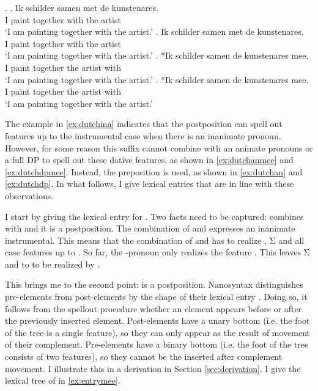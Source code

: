 \documentclass[11pt,a4paper]{article}
\begin{document}
\ex.
\ag. Ik schilder samen met de kunstenares.\\
 I paint together with the artist\\
 `I am painting together with the artist.'\label{ex:dutchan}
\bg. Ik schilder samen met de kunstenares.\\
 I paint together with the artist\\
 `I am painting together with the artist.'\label{ex:dutchdp}
\bg. *Ik schilder samen de kunstenares mee.\\
 I paint together the artist with\\
 `I am painting together with the artist.'\label{ex:dutchanmee}
\bg. *Ik schilder samen de kunstenares mee.\\
 I paint together the artist with\\
 `I am painting together with the artist.'\label{ex:dutchdpmee}

The example in \ref{ex:dutchina} indicates that the postposition  can spell out features up to the instrumental case when there is an inanimate pronoun. However, for some reason this suffix cannot combine with an animate pronouns or a full DP to spell out these dative features, as shown in \ref{ex:dutchanmee} and \ref{ex:dutchdpmee}. Instead, the preposition  is used, as shown in \ref{ex:dutchan} and \ref{ex:dutchdp}.
In what follows, I give lexical entries that are in line with these observations.

I start by giving the lexical entry for . Two facts need to be captured:  combines with  and it is a postposition. The combination of  and  expresses an inanimate instrumental.
This means that the combination of  and  has to realize , Σ and all case features up to . So far, the -pronoun  only realizes the feature . This leaves Σ and  to  to be realized by .

This brings me to the second point:  is a postposition. Nanosyntax distinguishes pre-elements from post-elements by the shape of their lexical entry \citep{starke2018}. Doing so, it follows from the spellout procedure whether an element appears before or after the previously inserted element. Post-elements have a unary bottom (i.e. the foot of the tree is a single feature), so they can only appear as the result of movement of their complement. Pre-elements have a binary bottom (i.e. the foot of the tree consists of two features), so they cannot be the inserted after complement movement. I illustrate this in a derivation in Section \ref{sec:derivation}. I give the lexical tree of  in \ref{ex:entrymee}.
\end{document}
